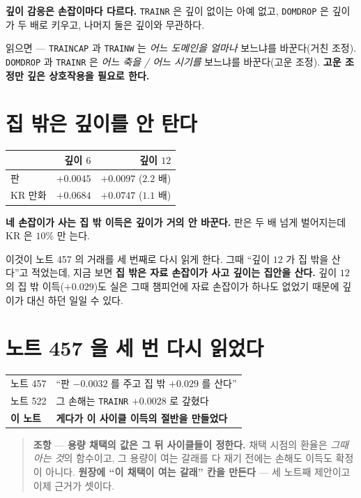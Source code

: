 \documentclass[11pt]{article}
\begin{document}
\textbf{깊이 감응은 손잡이마다 다르다.} \texttt{TRAINR} 은 깊이 없이는
아예 없고, \texttt{DOMDROP} 은 깊이가 두 배로 키우고, 나머지 둘은 깊이와
무관하다.

읽으면 --- \texttt{TRAINCAP} 과 \texttt{TRAINW} 는 \emph{어느 도메인을
얼마나} 보느냐를 바꾼다(거친 조정). \texttt{DOMDROP} 과 \texttt{TRAINR} 은
\emph{어느 축을 / 어느 시기를} 보느냐를 바꾼다(고운 조정). \textbf{고운
조정만 깊은 상호작용을 필요로 한다.}

\section{집 밖은 깊이를 안 탄다}

\begin{center}
\begin{tabular}{lrr}
\hline
& 깊이 $6$ & 깊이 $12$ \\
\hline
판 & $+0.0045$ & $+0.0097$ ($2.2$ 배) \\
KR 만화 & $+0.0684$ & $+0.0747$ ($1.1$ 배) \\
\hline
\end{tabular}
\end{center}

\textbf{네 손잡이가 사는 집 밖 이득은 깊이가 거의 안 바꾼다.} 판은 두 배
넘게 벌어지는데 KR 은 $10\%$ 만 는다.

이것이 노트 457 의 거래를 세 번째로 다시 읽게 한다. 그때 ``깊이 $12$ 가
집 밖을 산다''고 적었는데, 지금 보면 \textbf{집 밖은 자료 손잡이가 사고
깊이는 집안을 산다.} 깊이 $12$ 의 집 밖 이득($+0.029$)도 실은 그때
챔피언에 자료 손잡이가 하나도 없었기 때문에 깊이가 대신 하던 일일 수 있다.

\section*{노트 457 을 세 번 다시 읽었다}

\begin{center}
\begin{tabular}{ll}
\hline
노트 457 & ``판 $-0.0032$ 를 주고 집 밖 $+0.029$ 를 산다'' \\
노트 522 & 그 손해는 \texttt{TRAINR} $+0.0028$ 로 갚혔다 \\
\textbf{이 노트} & \textbf{게다가 이 사이클 이득의 절반을 만들었다} \\
\hline
\end{tabular}
\end{center}

\begin{quote}
\textbf{조항} --- \textbf{용량 채택의 값은 그 뒤 사이클들이 정한다.} 채택
시점의 환율은 \emph{그때 아는 것}의 함수이고, 그 용량이 여는 갈래를 다
재기 전에는 손해도 이득도 확정이 아니다. \textbf{원장에 ``이 채택이 여는
갈래'' 칸을 만든다} --- 세 노트째 제안이고 이제 근거가 셋이다.
\end{quote}
\end{document}
